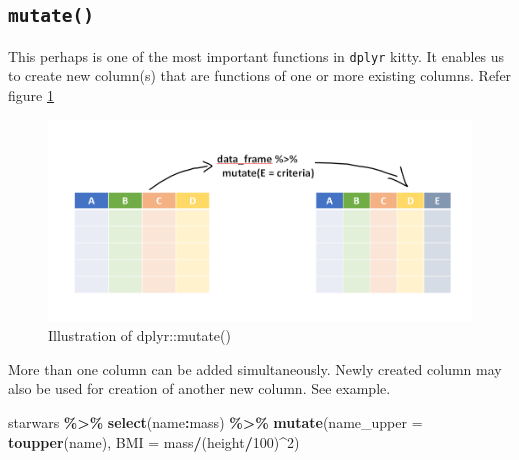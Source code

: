 \documentclass[
]{book}
\newenvironment{Shaded}{\begin{snugshade}}{\end{snugshade}}
\newcommand{\AttributeTok}[1]{\textcolor[rgb]{0.13,0.29,0.53}{#1}}
\newcommand{\DecValTok}[1]{\textcolor[rgb]{0.00,0.00,0.81}{#1}}
\newcommand{\FunctionTok}[1]{\textcolor[rgb]{0.13,0.29,0.53}{\textbf{#1}}}
\newcommand{\NormalTok}[1]{#1}
\newcommand{\SpecialCharTok}[1]{\textcolor[rgb]{0.81,0.36,0.00}{\textbf{#1}}}
\begin{document}
\hypertarget{mutate}{%
\subsection{\texorpdfstring{\texttt{mutate()}}{mutate()}}\label{mutate}}

This perhaps is one of the most important functions in \texttt{dplyr} kitty. It enables us to create new column(s) that are functions of one or more existing columns. Refer figure \ref{fig:mutater}

\begin{figure}

{\centering \includegraphics[width=0.99\linewidth]{images/mutate_dplyr} 

}

\caption{Illustration of dplyr::mutate()}\label{fig:mutater}
\end{figure}

More than one column can be added simultaneously. Newly created column may also be used for creation of another new column. See example.

\begin{Shaded}
\begin{Highlighting}[]
\NormalTok{starwars }\SpecialCharTok{\%\textgreater{}\%} 
  \FunctionTok{select}\NormalTok{(name}\SpecialCharTok{:}\NormalTok{mass) }\SpecialCharTok{\%\textgreater{}\%} 
  \FunctionTok{mutate}\NormalTok{(}\AttributeTok{name\_upper =} \FunctionTok{toupper}\NormalTok{(name),}
         \AttributeTok{BMI =}\NormalTok{ mass}\SpecialCharTok{/}\NormalTok{(height}\SpecialCharTok{/}\DecValTok{100}\NormalTok{)}\SpecialCharTok{\^{}}\DecValTok{2}\NormalTok{)}
\end{Highlighting}
\end{Shaded}
\end{document}
